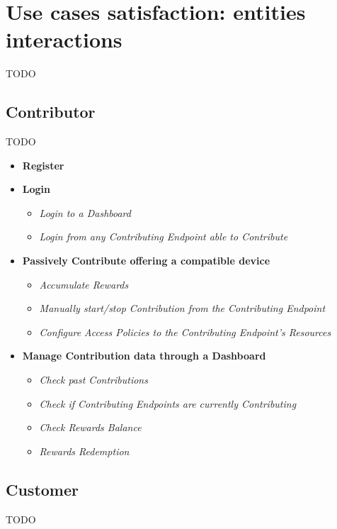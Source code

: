 \section{Use cases satisfaction: entities interactions}\label{use_cases_satisfaction}
TODO

\subsection{Contributor}
TODO

\begin{itemize}
    \item \textbf{Register}\\
    \item \textbf{Login}\\
    \begin{itemize}
        \item \textit{Login to a Dashboard}\\
        \item \textit{Login from any Contributing Endpoint able to Contribute}\\
    \end{itemize}
    \item \textbf{Passively Contribute offering a compatible device}\\
    \begin{itemize}
        \item \textit{Accumulate Rewards}\\
        \item \textit{Manually start/stop Contribution from the Contributing Endpoint}\\
        \item \textit{Configure Access Policies to the Contributing Endpoint's Resources}\\
    \end{itemize}
    \item \textbf{Manage Contribution data through a Dashboard}\\
    \begin{itemize}
        \item \textit{Check past Contributions}\\
        \item \textit{Check if Contributing Endpoints are currently Contributing}\\
        \item \textit{Check Rewards Balance}\\
        \item \textit{Rewards Redemption}\\
    \end{itemize}
\end{itemize}

\subsection{Customer}
TODO